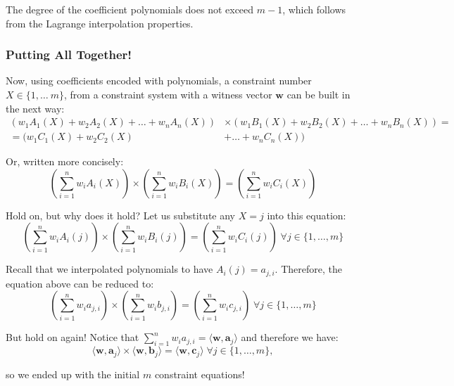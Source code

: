 \documentclass[../lecture-notes.tex]{subfiles}
\begin{document}
\begin{remark}
    The degree of the coefficient polynomials does not exceed $m - 1$, which follows from the Lagrange interpolation properties.
\end{remark}

\subsubsection{Putting All Together!}

Now, using coefficients encoded with polynomials, a constraint number $X \in \{1, \dots\ m\}$, from
a constraint system with a witness vector $\mathbf{w}$ can be built in the next way:
\begin{align*}
    (w_1A_1(X) + w_2A_2(X) + \dots + w_nA_n(X)) &\times (w_1B_1(X) + w_2B_2(X) + \dots + w_nB_n(X)) =\\ = (w_1C_1(X) + w_2C_2(X)& + \dots + w_nC_n(X))
\end{align*}

Or, written more concisely:
\begin{equation*}
    \left( \sum_{i = 1}^{n} w_iA_i(X) \right) \times \left( \sum_{i = 1}^{n} w_iB_i(X) \right) = \left( \sum_{i = 1}^{n} w_iC_i(X) \right)
\end{equation*}

\begin{remark}
    Hold on, but why does it hold? Let us substitute any $X=j$ into this equation:
    \begin{equation*}
        \left( \sum_{i = 1}^{n} w_iA_i(j) \right) \times \left( \sum_{i = 1}^{n} w_iB_i(j) \right) = \left( \sum_{i = 1}^{n} w_iC_i(j) \right) \; \forall j \in \{1,\dots,m\}
    \end{equation*}

    Recall that we interpolated polynomials to have $A_i(j) = a_{j,i}$. Therefore, the equation above can be reduced to:
    \begin{equation*}
        \left( \sum_{i = 1}^{n} w_ia_{j,i} \right) \times \left( \sum_{i = 1}^{n} w_ib_{j,i} \right) = \left( \sum_{i = 1}^{n} w_ic_{j,i} \right) \; \forall j \in \{1,\dots,m\}
    \end{equation*}

    But hold on again! Notice that $\sum_{i = 1}^{n} w_ia_{j,i} = \langle \mathbf{w}, \mathbf{a}_j \rangle$ and therefore we have:
    \begin{equation*}
        \langle \mathbf{w}, \mathbf{a}_j \rangle \times \langle \mathbf{w}, \mathbf{b}_j \rangle = \langle \mathbf{w}, \mathbf{c}_j \rangle \; \forall j \in \{1,\dots,m\},
    \end{equation*}
    
    so we ended up with the initial $m$ constraint equations!
\end{remark}
\end{document}
